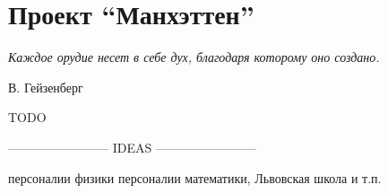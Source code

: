\chapter{Проект ``Манхэттен''}

\epigraph{\emph{Каждое орудие несет в себе дух, \break благодаря которому оно создано.}}{В. Гейзенберг}

TODO

------------------------ IDEAS ------------------------ 

персоналии физики
персоналии математики, Львовская школа и т.п.
